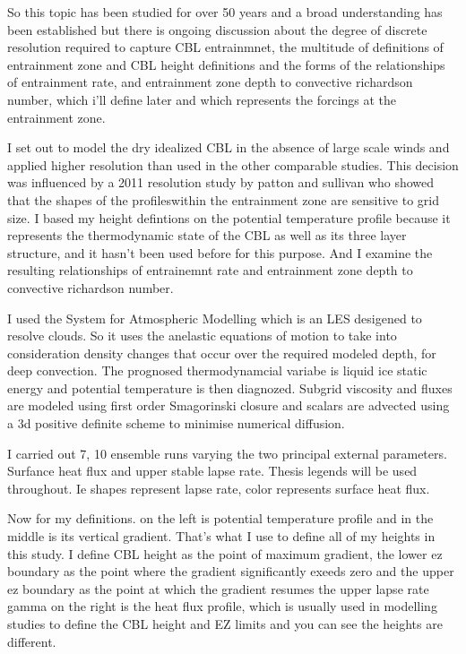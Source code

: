 \documentclass{beamer}
\begin{document}
\begin{frame}
So this topic has been studied for over 50 years and a broad understanding has been established but there is ongoing discussion about the degree of discrete resolution required to capture CBL entrainmnet, the multitude of definitions of entrainment zone and CBL height definitions and the forms of the relationships of entrainment rate, and entrainment zone depth to convective richardson number, which i'll define later and which represents the forcings at the entrainment zone.

\end{frame}


\begin{frame}
I set out to model the dry idealized CBL in the absence of large scale winds and applied higher resolution than used in the other comparable studies.  This decision was influenced by a 2011 resolution study by patton and sullivan who showed that the shapes of the profileswithin the entrainment zone are sensitive to grid size. I based my height defintions on the potential temperature profile because it represents the thermodynamic state of the CBL as well as its three layer structure, and it hasn't been used before for this purpose.  And I examine the resulting relationships of entrainemnt rate and entrainment zone depth to convective richardson number.  
\end{frame}


\begin{frame}
I used the System for Atmospheric Modelling which is an LES desigened to resolve clouds.  So it uses the anelastic equations of motion to take into consideration density changes that occur over the required modeled depth, for deep convection. The prognosed thermodynamcial variabe is liquid ice static energy and potential temperature is then diagnozed.  Subgrid viscosity and fluxes are modeled using first order Smagorinski closure and scalars are advected using a 3d positive definite scheme to minimise numerical diffusion.\\
\end{frame}

\begin{frame}
I carried out 7, 10 ensemble runs varying the two principal external parameters.  Surfance heat flux and upper stable lapse rate. Thesis legends will be used throughout.  Ie shapes represent lapse rate, color represents surface heat flux.
\end{frame}

\begin{frame}
Now for my definitions. on the left is potential temperature profile and in the middle is its vertical gradient.  That's what I use to define all of my heights in this study.  I define CBL height as the point of maximum gradient, the lower ez boundary as the point where the gradient significantly exeeds zero and the upper ez boundary as the point at which the gradient resumes the upper lapse rate gamma on the right is the heat flux profile, which is usually used in modelling studies to define the CBL height and EZ limits and you can see the heights are different.\\
\end{frame}
\end{document}
